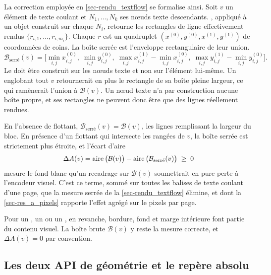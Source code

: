 La correction employée en \cref{sec-rendu_textflow} se formalise ainsi. Soit $v$
un élément de texte coulant et $N_1, \dots, N_k$ ses nœuds texte descendants.
, appliqué à un objet  construit sur chaque
$N_i$, retourne les rectangles de ligne effectivement rendus
$\{r_{i,1}, \dots, r_{i,m_i}\}$. Chaque $r$ est un quadruplet
$(x^{(0)}, y^{(0)}, x^{(1)}, y^{(1)})$ de coordonnées de coins. La boîte serrée
est l'enveloppe rectangulaire de leur union.
\begin{equation}
\mathcal{B}_{\text{serré}}(v) = \Big[
  \min_{i,j} x^{(0)}_{i,j},\;
  \min_{i,j} y^{(0)}_{i,j},\;
  \max_{i,j} x^{(1)}_{i,j} - \min_{i,j} x^{(0)}_{i,j},\;
  \max_{i,j} y^{(1)}_{i,j} - \min_{i,j} y^{(0)}_{i,j}
\Big].
\label{eq-boite_serree}
\end{equation}
Le  doit être construit sur les nœuds texte et non sur
l'élément lui-même. Un  englobant tout $v$ retournerait en plus le
rectangle de sa boîte pleine largeur, ce qui ramènerait l'union à
$\mathcal{B}(v)$. Un nœud texte n'a par construction aucune boîte propre, et ses
rectangles ne peuvent donc être que des lignes réellement rendues.

En l'absence de flottant, $\mathcal{B}_{\text{serré}}(v) = \mathcal{B}(v)$, les
lignes remplissant la largeur du bloc. En présence d'un flottant qui intersecte
les rangées de $v$, la boîte serrée est strictement plus étroite, et l'écart
d'aire
\begin{equation}
\Delta A(v) = \operatorname{\text{\normalfont aire}}\big(\mathcal{B}(v)\big) - \operatorname{\text{\normalfont aire}}\big(\mathcal{B}_{\text{serré}}(v)\big) \;\geq\; 0
\label{eq-aire_perdue}
\end{equation}
mesure le fond blanc qu'un recadrage sur $\mathcal{B}(v)$ soumettrait en pure
perte à l'encodeur visuel. C'est ce terme, sommé sur toutes les balises de texte
coulant d'une page, que la mesure serrée de la \cref{sec-rendu_textflow}
élimine, et dont la \cref{sec-res_a_pixels} rapporte l'effet agrégé sur le
pixels par page.

Pour un , un  ou un , en revanche,
bordure, fond et marge intérieure font partie du contenu visuel. La boîte brute
$\mathcal{B}(v)$ y reste la mesure correcte, et $\Delta A(v) = 0$ par
convention.

\subsection{Les deux API de géométrie et le repère absolu}
\label{sec-eda_dom_api}

